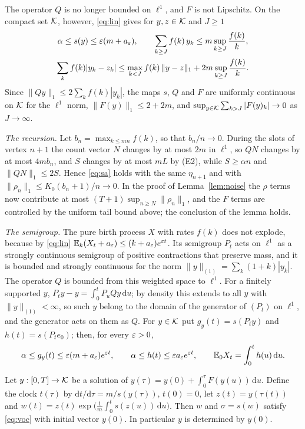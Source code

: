 The operator $Q$ is no longer bounded on $\ell^1$, and $F$ is not Lipschitz. On the compact set $\mathcal{K}$, however,
\eqref{eq:lin} gives for $y,z\in\mathcal{K}$ and $J\ge1$
\begin{equation}\label{eq:stail}
\begin{gathered}
   \alpha\le s(y)\le\varepsilon(m+a_\varepsilon),\qquad \sum_{k\ge J}f(k)\,y_k\le m\sup_{k\ge J}\frac{f(k)}k,\\
   \sum_kf(k)|y_k-z_k|\le\max_{k<J}f(k)\,\|y-z\|_1+2m\sup_{k\ge J}\frac{f(k)}k .
\end{gathered}
\end{equation}
Since $\|Qy\|_1\le2\sum_kf(k)|y_k|$, the maps $s$, $Q$ and $F$ are uniformly continuous on $\mathcal{K}$ for the
$\ell^1$ norm, $\|F(y)\|_1\le2+2m$, and $\sup_{y\in\mathcal{K}}\sum_{k>J}|F(y)_k|\to0$ as $J\to\infty$.

\emph{The recursion.} Let $b_n=\max_{k\le mn}f(k)$, so that $b_n/n\to0$. During the slots of vertex $n+1$ the
count vector $N$ changes by at most $2m$ in $\ell^1$, so $QN$ changes by at most $4mb_n$, and $S$ changes by at
most $mL$ by \textup{(E2)}, while $S\ge\alpha n$ and $\|QN\|_1\le2S$. Hence \eqref{eq:sa} holds with the same
$\eta_{n+1}$ and with $\|\rho_n\|_1\le K_0(b_n+1)/n\to0$. In the proof of Lemma~\ref{lem:noise} the
$\rho$ terms now contribute at most $(T+1)\sup_{n\ge N}\|\rho_n\|_1$, and the $F$ terms are controlled by the
uniform tail bound above; the conclusion of the lemma holds.

\emph{The semigroup.} The pure birth process $X$ with rates $f(k)$ does not explode, because by \eqref{eq:lin}
$\mathbb{E}_k(X_t+a_\varepsilon)\le(k+a_\varepsilon)e^{\varepsilon t}$. Its semigroup $P_t$ acts on $\ell^1$ as a strongly continuous
semigroup of positive contractions that preserve mass, and it is bounded and strongly continuous for the norm
$\|y\|_{(1)}=\sum_k(1+k)|y_k|$. The operator $Q$ is bounded from this weighted space to $\ell^1$. For a finitely
supported $y$, $P_ty-y=\int_0^tP_uQy\,\mathrm du$; by density this extends to all $y$ with
$\|y\|_{(1)}<\infty$, so such $y$ belong to the domain of the generator of $(P_t)$ on $\ell^1$, and the generator
acts on them as $Q$. For $y\in\mathcal{K}$ put $g_y(t)=s(P_ty)$ and $h(t)=s(P_te_0)$; then, for every $\varepsilon>0$,
\begin{equation}\label{eq:gh}
   \alpha\le g_y(t)\le\varepsilon(m+a_\varepsilon)e^{\varepsilon t},\qquad \alpha\le h(t)\le\varepsilon a_\varepsilon e^{\varepsilon t},
   \qquad \mathbb{E}_0X_t=\int_0^th(u)\,\mathrm du .
\end{equation}

\begin{lemma}\label{lem:flow2}
Let $y:[0,T]\to\mathcal{K}$ be a solution of $y(\tau)=y(0)+\int_0^\tau F(y(u))\,\mathrm du$. Define the clock $t(\tau)$ by
$\mathrm dt/\mathrm d\tau=m/s(y(\tau))$, $t(0)=0$, let $z(t)=y(\tau(t))$ and
$w(t)=z(t)\exp\bigl(\frac1m\int_0^ts(z(u))\,\mathrm du\bigr)$. Then $w$ and $\sigma=s(w)$ satisfy \eqref{eq:voc}
with initial vector $y(0)$. In particular $y$ is determined by $y(0)$.
\end{lemma}

